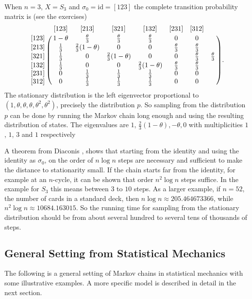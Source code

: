 \documentclass[12pt]{article}
\begin{document}
When \( n=3 \), \( X = S_3 \) and \( \sigma_0 = \text{id} = [123] \) the
complete transition probability matrix is (see the exercises)
\[
    \bordermatrix{ & [123] & [213] & [321] & [132] & [231] & [312] \cr
    [123] & 1-\theta & \frac{\theta}{3} & \frac{\theta}{3} & \frac{\theta}
    {3} & 0 & 0 \cr
    [213] & \frac{1}{3} & \frac{2}{3}(1-\theta) & 0 & 0 & \frac{\theta}{3}
    & \frac {\theta}{3} \cr
    [321] & \frac{1}{3} & 0 & \frac{2}{3}(1-\theta) & 0 & 0 & \frac{\theta}
    {3} & \frac{\theta}{3} \cr
    [132] & \frac{1}{3} & 0 & 0 & \frac{2}{3}(1-\theta) & \frac{\theta}{3}
    & \frac{\theta}{3} \cr
    [231] & 0 & \frac{1}{3} & \frac{1}{3} & \frac{1}{3} & 0 & 0 \cr
    [312] & 0 & \frac{1}{3} & \frac{1}{3} & \frac{1}{3} & 0 & 0 \cr
    }.
\] The stationary distribution is the left eigenvector proportional to \(
(1,\theta, \theta, \theta, \theta^2, \theta^2) \), precisely the
distribution \( p \).  So sampling from the distribution \( p \) can be
done by running the Markov chain long enough and using the resulting
distribution of states.  The eigenvalues are \( 1 \), \( \frac{2}{3}(1-\theta),
-\theta, 0 \) with multiplicities \( 1 \), \( 1 \), \( 3 \) and \( 1 \)
respectively

A theorem from Diaconis
\cite{diaconis81, diaconis09, diaconis98}, shows that starting from the
identity and using the identity as \( \sigma_0 \), on the order of \( n
\log n \) steps are necessary and sufficient to make the distance to
stationarity small.  If the chain starts far from the identity, for
example at an \( n \)-cycle, it can be shown that order \( n^2 \log n \)
steps suffice.  In the example for \( S_3 \) this means between \( 3 \)
to \( 10 \) steps.  As a larger example, if \( n = 52 \), the number of
cards in a standard deck, then \( n \log n \approx 205.464673366 \),
while \( n^2 \log n \approx 10684.163015 \).  So the running time for
sampling from the stationary distribution should be from about several
hundred to several tens of thousands of steps.%

\subsection*{General Setting from Statistical Mechanics}

The following is a general setting of Markov chains in statistical
mechanics with some illustrative examples.%
A more specific model is described in detail in the next section.
\end{document}
